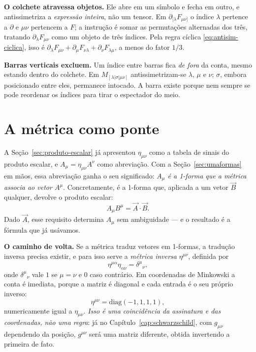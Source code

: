 \documentclass[12pt,a4paper,oneside]{book}
\theoremstyle{rgplain}
\theoremstyle{rgremark}
\begin{document}
\begin{etapas}
  \item \textbf{O colchete atravessa objetos.} Ele abre em um símbolo e fecha
  em outro, e antissimetriza a \emph{expressão inteira}, não um tensor. Em
  $\partial_{[\lambda}F_{\mu\nu]}$ o índice $\lambda$ pertence a $\partial$ e
  $\mu\nu$ pertencem a $F$; a instrução é somar as permutações alternadas dos
  três, tratando $\partial_\lambda F_{\mu\nu}$ como um objeto de três índices.
  Pela regra cíclica \eqref{eq:antisim-ciclica}, isso é
  $\partial_\lambda F_{\mu\nu}+\partial_\mu F_{\nu\lambda}
   +\partial_\nu F_{\lambda\mu}$, a menos do fator $1/3$.

  \item \textbf{Barras verticais excluem.} Um índice entre barras fica
  \emph{de fora} da conta, mesmo estando dentro do colchete. Em
  $M_{[\lambda|\sigma|\mu\nu]}$ antissimetrizam-se $\lambda$, $\mu$ e $\nu$;
  $\sigma$, embora posicionado entre eles, permanece intocado. A barra existe
  porque nem sempre se pode reordenar os índices para tirar o espectador do
  meio.
\end{etapas}

\section{A métrica como ponte}
\label{sec:metrica-ponte}

A Seção~\ref{sec:produto-escalar} já apresentou $\eta_{\mu\nu}$ como a tabela
de sinais do produto escalar, e $A_\mu=\eta_{\mu\nu}A^\nu$ como abreviação.
Com a Seção~\ref{sec:umaformas} em mãos, essa abreviação ganha o seu
significado: \emph{$A_\mu$ é a 1-forma que a métrica associa ao vetor
$A^\mu$}. Concretamente, é a 1-forma que, aplicada a um vetor $\vec B$
qualquer, devolve o produto escalar:
\[
  A_\mu B^\mu=\vec A\cdot\vec B .
\]
Dado $\vec A$, esse requisito determina $A_\mu$ sem ambiguidade --- e o
resultado é a fórmula que já usávamos.

\textbf{O caminho de volta.} Se a métrica traduz vetores em 1-formas, a
tradução inversa precisa existir, e para isso serve a \emph{métrica inversa}
$\eta^{\mu\nu}$, definida por
\begin{equation}
  \eta^{\mu\alpha}\eta_{\alpha\nu}=\delta^\mu{}_\nu ,
  \label{eq:metrica-inversa}
\end{equation}
onde $\delta^\mu{}_\nu$ vale $1$ se $\mu=\nu$ e $0$ caso contrário. Em
coordenadas de Minkowski a conta é imediata, porque a matriz é diagonal e cada
entrada é o seu próprio inverso:
\[
  \eta^{\mu\nu}=\mathrm{diag}(-1,1,1,1),
\]
numericamente igual a $\eta_{\mu\nu}$. \emph{Isso é uma coincidência da
assinatura e das coordenadas, não uma regra}: já no Capítulo~\ref{cap:schwarzschild},
com $g_{\mu\nu}$ dependendo da posição, $g^{\mu\nu}$ será uma matriz
diferente, obtida invertendo a primeira de fato.
\end{document}
